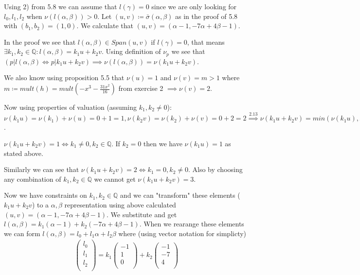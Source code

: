 \documentclass[12pt, a4paper]{article}
\begin{document}
Using 2) from 5.8 we can assume that $l(\gamma)=0$ since we are only looking for $l_0,l_1,l_2$ when $\nu(l(\alpha,\beta))>0$. Let $(u,v) \coloneqq \bar{\sigma}(\alpha,\beta)$ as in the proof of 5.8 with $(b_1,b_2) = (1,0)$. We calculate that $(u,v) = (\alpha-1, -7\alpha+4\beta-1)$.

In the proof we see that $l(\alpha,\beta) \in Span(u,v)$ if $l(\gamma)=0$, that means $\exists k_1,k_2 \in \mathbb{Q}: l(\alpha, \beta) = k_1u + k_2v$. Using definition of $\nu_p$ we see that $(p | l(\alpha,\beta) \iff p| k_1u+k_2v) \implies \nu(l(\alpha, \beta))=\nu(k_1u+k_2v)$. 

We also know using proposition 5.5 that $\nu(u)=1$ and $\nu(v)=m>1$ where $m \coloneqq mult(h) = mult(-x^3-\frac{31 x^2}{16})$ from exercise 2 $\implies \nu(v)=2$.

Now using properties of valuation (assuming $k_1,k_2 \neq 0$): $\nu(k_1u)=\nu(k_1)+\nu(u) = 0 + 1 = 1, \nu(k_2v)=\nu(k_2)+\nu(v) = 0 + 2 = 2 \stackrel{2.13}{\implies} \nu(k_1u+k_2v) = min(\nu(k_1u),\nu(k_2v)) = min(1,2) = 1$.

$\nu(k_1u+k_2v) = 1 \iff k_1 \neq 0, k_2 \in \mathbb{Q}$. If $k_2=0$ then we have $\nu(k_1u)=1$ as stated above.

Similarly we can see that $\nu(k_1u+k_2v) = 2 \iff k_1 = 0, k_2 \neq 0$. Also by choosing any combination of $k_1,k_2 \in \mathbb{Q}$ we cannot get $\nu(k_1u+k_2v) = 3$.

Now we have constraints on $k_1,k_2 \in \mathbb{Q}$ and we can "transform" these elements ($k_1u+k_2v$) to a $\alpha, \beta$ representation using above calculated $(u,v) = (\alpha-1, -7\alpha+4\beta-1)$. We substitute and get $l(\alpha,\beta) = k_1(\alpha-1)+k_2(-7\alpha+4\beta-1)$. When we rearange these elements we can form $l(\alpha,\beta) = l_0 + l_1\alpha + l_2\beta$ where (using vector notation for simplicty)
\begin{gather*}
\begin{pmatrix}
l_0\\
l_1\\
l_2\\
\end{pmatrix} = k_1\begin{pmatrix}
-1\\
1\\
0\\
\end{pmatrix} + k_2\begin{pmatrix}
-1\\
-7\\
4\\
\end{pmatrix}
\end{gather*}
\end{document}

